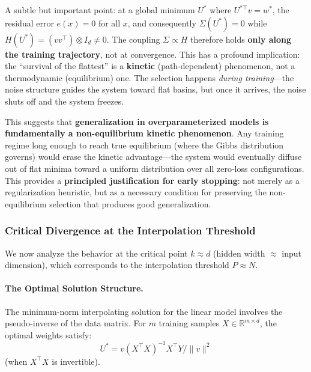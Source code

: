 \documentclass[
  journal=largetwo,
  year=2025,
  volume=37,
]{cup-journal}
\begin{document}
\begin{remark}\label{rmk:coupling_vanishes}
A subtle but important point: at a global minimum $U^*$ where $U^{*\top}v = w^*$, the residual error $e(x) = 0$ for all $x$, and consequently $\Sigma(U^*) = 0$ while $H(U^*) = (vv^\top)\otimes I_d \neq 0$. The coupling $\Sigma \propto H$ therefore holds \textbf{only along the training trajectory}, not at convergence. This has a profound implication: the ``survival of the flattest'' is a \textbf{kinetic} (path-dependent) phenomenon, not a thermodynamic (equilibrium) one. The selection happens \textit{during training}---the noise structure guides the system toward flat basins, but once it arrives, the noise shuts off and the system freezes.

This suggests that \textbf{generalization in overparameterized models is fundamentally a non-equilibrium kinetic phenomenon}. Any training regime long enough to reach true equilibrium (where the Gibbs distribution governs) would erase the kinetic advantage---the system would eventually diffuse out of flat minima toward a uniform distribution over all zero-loss configurations. This provides a \textbf{principled justification for early stopping}: not merely as a regularization heuristic, but as a necessary condition for preserving the non-equilibrium selection that produces good generalization.
\end{remark}



\subsubsection{Critical Divergence at the Interpolation Threshold}

We now analyze the behavior at the critical point $k \approx d$ (hidden width $\approx$ input dimension), which corresponds to the interpolation threshold $P \approx N$.

\paragraph{The Optimal Solution Structure.}
The minimum-norm interpolating solution for the linear model involves the pseudo-inverse of the data matrix. For $m$ training samples $X \in \mathbb{R}^{m \times d}$, the optimal weights satisfy:
\begin{equation}
    U^* = v (X^\top X)^{-1} X^\top Y / \|v\|^2
\end{equation}
(when $X^\top X$ is invertible).
\end{document}
